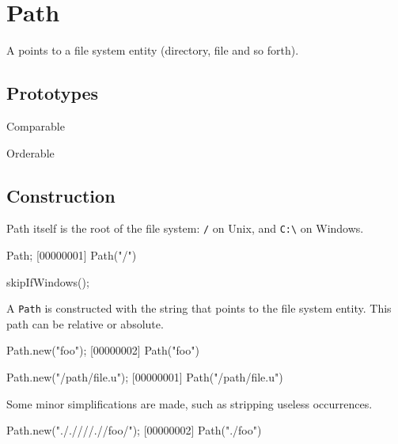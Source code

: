 
\section{Path}

A  points to a file system entity (directory, file and so
forth).

\subsection{Prototypes}
\begin{refObjects}
\item[Comparable]
\item[Orderable]
\end{refObjects}

\subsection{Construction}

Path itself is the root of the file system: \lstinline|/| on Unix, and
\lstinline|C:\| on Windows.

\begin{urbiscript}[firstnumber=1]
Path;
[00000001] Path("/")
\end{urbiscript}
\begin{urbicomment}
skipIfWindows();
\end{urbicomment}

A \lstinline|Path| is constructed with the string that points to the file
system entity.  This path can be relative or absolute.

\begin{urbiscript}[firstnumber=1]
Path.new("foo");
[00000002] Path("foo")

Path.new("/path/file.u");
[00000001] Path("/path/file.u")
\end{urbiscript}

Some minor simplifications are made, such as stripping useless
 occurrences.

\begin{urbiscript}
Path.new("././///.//foo/");
[00000002] Path("./foo")
\end{urbiscript}

